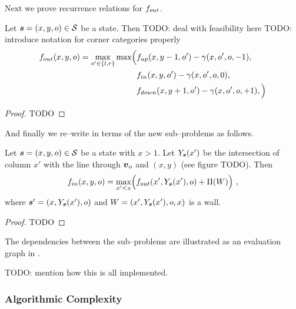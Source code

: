 Next we prove recurrence relations for $\SubProbOUT$.

\begin{corollary}
  Let $\State=(x,y,\WallOrient)\in\StateSpace$ be a state. Then
  TODO: deal with feasibility here
  TODO: introduce notation for corner categories properly
  \begin{equation}
    \begin{split}
      \label{eq:fout-recurrence}
      \SubProbOUT(x,y,\WallOrient) = 
      \max_{\WallOrient'\in\{l,r\}} \max \Bigl(
        &\SubProbUP(x,y-1,\WallOrient')
        - \CornerPenalty(x,\WallOrient',\WallOrient,-1),\\
        &\SubProbIN(x,y,\WallOrient')
        - \CornerPenalty(x,\WallOrient',\WallOrient,0),\\
        &\SubProbDOWN(x,y+1,\WallOrient')
        - \CornerPenalty(x,\WallOrient',\WallOrient,+1),
      \Bigr)
    \end{split}
  \end{equation}
\end{corollary}
\begin{proof}
  TODO
\end{proof}

And finally we re--write  in terms of the new
sub--problems as follows.

\begin{corollary}
  \label{cor:fin-recurrence-second}
  Let $\State=(x,y,\WallOrient)\in\StateSpace$ be a state with
  $x>1$. Let $Y_{\State}(x')$ be the intersection of column $x'$ with
  the line through $\vpt_{\WallOrient}$ and $(x,y)$ (see figure
  TODO). Then
  \begin{equation}
    \label{eq:fin-recurrence-second}
    \SubProbIN(x,y,\WallOrient) =
    \max_{x'<x}\limits
    \Bigl(
      \SubProbOUT(x',Y_{\State}(x'),\WallOrient) + \WallPayoff(\Wall)
    \Bigr) ~,
  \end{equation}
  where $\State'=(x,Y_{\State}(x'),\WallOrient)$ and
  $\Wall=(x',Y_{\State}(x'),\WallOrient,x)$ is a wall.
\end{corollary}
\begin{proof}
  TODO
\end{proof}

The dependencies between the sub--problems are illustrated as an
evaluation graph in .

TODO: mention how this is all implemented.

\subsubsection{Algorithmic Complexity}

